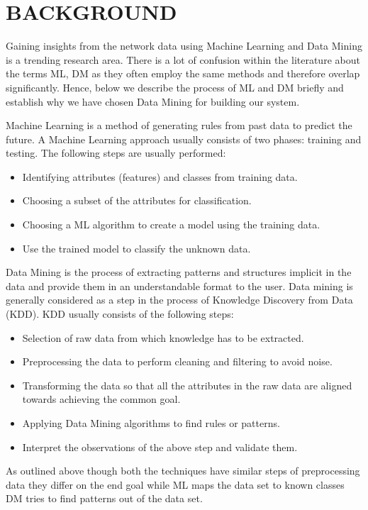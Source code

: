 
\chapter{BACKGROUND}

Gaining insights from the network data using Machine Learning and Data Mining is a trending research area. There is a lot of confusion within the literature about the terms ML, DM as they often employ the same methods and therefore overlap significantly. Hence, below we describe the process of ML and DM briefly and establish why we have chosen Data Mining for building our system.

Machine Learning is a method of generating rules from past data to predict the future.
A Machine Learning approach usually consists of two phases:
training and testing. The following steps are usually performed:
\begin{itemize}
	\item Identifying attributes (features) and classes from training data.
	\item Choosing a subset of the attributes for classification.
	\item Choosing a ML algorithm to create a model using the training data.
	\item Use the trained model to classify the unknown data.
\end{itemize}	

Data Mining is the process of extracting patterns and structures implicit in the data and provide them in an understandable format to the user. Data mining is generally considered as a step in the process of Knowledge Discovery from Data (KDD). KDD usually consists of the following steps:
\begin{itemize}
	\item Selection of raw data from which knowledge has to be extracted.
	\item Preprocessing the data to perform cleaning and filtering to avoid noise.
	\item Transforming the data so that all the attributes in the raw data are aligned towards achieving the common goal. 
	\item Applying Data Mining algorithms to find rules or patterns.
	\item Interpret the observations of the above step and validate them.
	
\end{itemize}

As outlined above though both the techniques have similar steps of preprocessing data they differ on the end goal while ML maps the data set to known classes DM tries to find patterns out of the data set.

